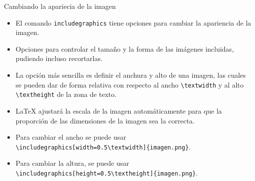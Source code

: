 \documentclass[12pt]{beamer}
\begin{document}
\begin{frame}{Cambiando la apariecia de la imagen}
  \begin{itemize}
    \item El comando \texttt{\color{blue}includegraphics} tiene opciones para cambiar la apariencia de la imagen.
    \item<2-> Opciones para controlar el tamaño y la forma de las imágenes incluidas, pudiendo incluso recortarlas. 
    \item<3-> La opción más sencilla es definir el anchura y alto de una imagen, las cuales se pueden dar de forma relativa con respecto al ancho \texttt{\color{blue}\textbackslash textwidth} y al alto \texttt{\color{blue}\textbackslash textheight} de la zona de texto.
    \item<4-> \LaTeX{} ajustará la escala de la imagen automáticamente para que la proporción de las dimensiones de la imagen sea la correcta.
    \item <5-> Para cambiar el ancho se puede usar \texttt{\color{blue}\textbackslash includegraphics[width=0.5\textbackslash textwidth]\{imagen.png\}}.
    \item <6-> Para cambiar la altura, se puede usar \texttt{\color{blue}\textbackslash includegraphics[height=0.5\textbackslash textheight]\{imagen.png\}}.
  \end{itemize}
\end{frame}
\end{document}
